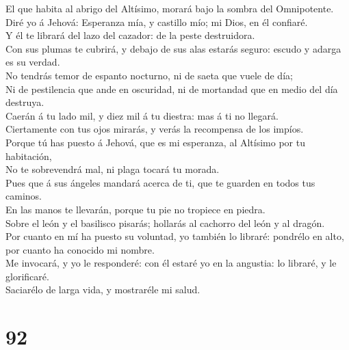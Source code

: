  El que habita al abrigo del Altísimo, morará bajo la sombra
del Omnipotente.\\
 Diré yo á Jehová: Esperanza mía, y castillo mío; mi Dios,
en él confiaré.\\
 Y él te librará del lazo del cazador: de la peste
destruidora.\\
 Con sus plumas te cubrirá, y debajo de sus alas estarás
seguro: escudo y adarga es su verdad.\\
 No tendrás temor de espanto nocturno, ni de saeta que vuele
de día;\\
 Ni de pestilencia que ande en oscuridad, ni de mortandad
que en medio del día destruya.\\
 Caerán á tu lado mil, y diez mil á tu diestra: mas á ti no
llegará.\\
 Ciertamente con tus ojos mirarás, y verás la recompensa de
los impíos.\\
 Porque tú has puesto á Jehová, que es mi esperanza, al
Altísimo por tu habitación,\\
 No te sobrevendrá mal, ni plaga tocará tu morada.\\
 Pues que á sus ángeles mandará acerca de ti, que te
guarden en todos tus caminos.\\
 En las manos te llevarán, porque tu pie no tropiece en
piedra.\\
 Sobre el león y el basilisco pisarás; hollarás al cachorro
del león y al dragón.\\
 Por cuanto en mí ha puesto su voluntad, yo también lo
libraré: pondrélo en alto, por cuanto ha conocido mi nombre.\\
 Me invocará, y yo le responderé: con él estaré yo en la
angustia: lo libraré, y le glorificaré.\\
 Saciarélo de larga vida, y mostraréle mi salud.

\hypertarget{section-91}{%
\section{92}\label{section-91}}

